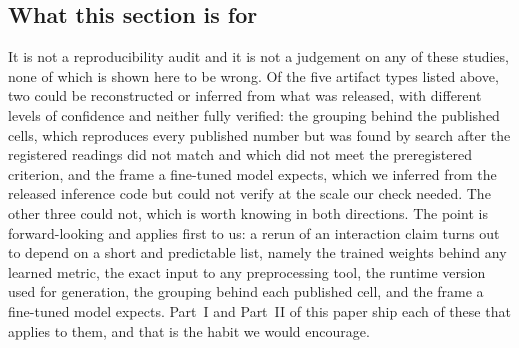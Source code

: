 \subsection{What this section is for}

It is not a reproducibility audit and it is not a judgement on any of these
studies, none of which is shown here to be wrong. Of the five artifact types listed above, two could be reconstructed or inferred
from what was released, with different levels of confidence and neither fully
verified: the grouping behind the published cells, which reproduces every
published number but was found by search after the registered readings did not
match and which did not meet the preregistered criterion, and the frame a
fine-tuned model expects, which we inferred from the released inference code but
could not verify at the scale our check needed. The other three could not, which
is worth knowing in both directions. The point is forward-looking and applies first to us: a
rerun of an interaction claim turns out to depend on a short and predictable
list, namely the trained weights behind any learned metric, the exact input to
any preprocessing tool, the runtime version used for generation, the grouping
behind each published cell, and the frame a fine-tuned model expects. Part~I and Part~II of this paper ship each of these that applies to them, and
that is the habit we would encourage.
